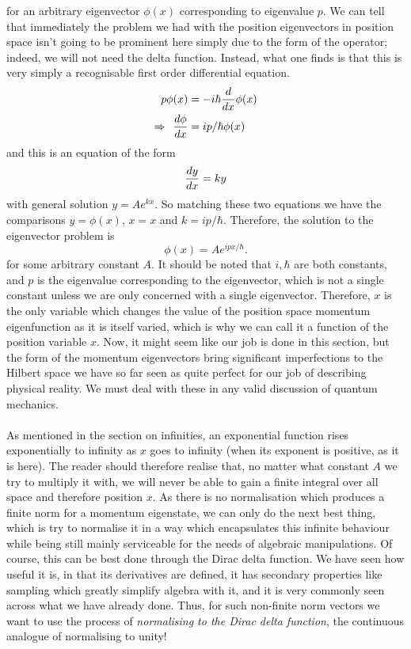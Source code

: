 for an arbitrary eigenvector $\phi(x)$ corresponding to eigenvalue $p$. We can tell that immediately the problem we had with the position eigenvectors in position space isn't going to be prominent here simply due to the form of the operator; indeed, we will not need the delta function. Instead, what one finds is that this is very simply a recognisable first order differential equation.
$$
\begin{aligned}
p\phi(x)&=-i\hbar\frac{d}{d x}\phi(x)\\
\Rightarrow\:\:\frac{d\phi}{d x}&=ip/\hbar\phi(x)
\end{aligned}
$$
and this is an equation of the form 
$$
\frac{dy}{d x}=ky
$$
with general solution $y=Ae^{kx}$. So matching these two equations we have the comparisons $y=\phi(x)$, $x=x$ and $k=ip/\hbar$. Therefore, the solution to the eigenvector problem is 
$$
\phi(x)=Ae^{ipx/\hbar}.
$$
for some arbitrary constant $A$. It should be noted that $i,\hbar$ are both constants, and $p$ is the eigenvalue corresponding to the eigenvector, which is not a single constant unless we are only concerned with a single eigenvector. Therefore, $x$ is the only variable which changes the value of the position space momentum eigenfunction as it is itself varied, which is why we can call it a function of the position variable $x$. Now, it might seem like our job is done in this section, but the form of the momentum eigenvectors bring significant imperfections to the Hilbert space we have so far seen as quite perfect for our job of describing physical reality. We must deal with these in any valid discussion of quantum mechanics.
\\\\
As mentioned in the section on infinities, an exponential function rises exponentially to infinity as $x$ goes to infinity (when its exponent is positive, as it is here). The reader should therefore realise that, no matter what constant $A$ we try to multiply it with, we will never be able to gain a finite integral over all space and therefore position $x$. As there is no normalisation which produces a finite norm for a momentum eigenstate, we can only do the next best thing, which is try to  normalise it in a way which encapsulates this infinite behaviour while being still mainly serviceable for the needs of algebraic manipulations. Of course, this can be best done through the Dirac delta function. We have seen how useful it is, in that its derivatives are defined, it has secondary properties like sampling which greatly simplify algebra with it, and it is very commonly seen across what we have already done. Thus, for such non-finite norm vectors we want to use the process of \textit{normalising to the Dirac delta function}, the continuous analogue of normalising to unity!
